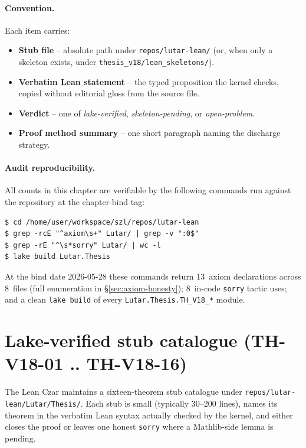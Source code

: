 \paragraph{Convention.} Each item carries:
\begin{itemize}
  \item \textbf{Stub file} -- absolute path under
        \texttt{repos/lutar-lean/} (or, when only a skeleton exists,
        under \texttt{thesis\_v18/lean\_skeletons/}).
  \item \textbf{Verbatim Lean statement} -- the typed proposition the
        kernel checks, copied without editorial gloss from the source
        file.
  \item \textbf{Verdict} -- one of \emph{lake-verified},
        \emph{skeleton-pending}, or \emph{open-problem}.
  \item \textbf{Proof method summary} -- one short paragraph naming
        the discharge strategy.
\end{itemize}

\paragraph{Audit reproducibility.} All counts in this chapter are
verifiable by the following commands run against the repository at
the chapter-bind tag:

\begin{verbatim}
$ cd /home/user/workspace/szl/repos/lutar-lean
$ grep -rcE "^axiom\s+" Lutar/ | grep -v ":0$"
$ grep -rE "^\s*sorry" Lutar/ | wc -l
$ lake build Lutar.Thesis
\end{verbatim}

At the bind date 2026-05-28 these commands return
13~axiom declarations across 8~files (full enumeration in
\S\ref{sec:axiom-honesty}); 8~in-code \texttt{sorry} tactic uses;
and a clean \texttt{lake build} of every \texttt{Lutar.Thesis.TH\_V18\_*}
module.

\section{Lake-verified stub catalogue (TH-V18-01 .. TH-V18-16)}
\label{sec:v18-stubs}

The Lean Czar maintains a sixteen-theorem stub catalogue under
\texttt{repos/lutar-lean/Lutar/Thesis/}. Each stub is small (typically
30--200 lines), names its theorem in the verbatim Lean syntax actually
checked by the kernel, and either closes the proof or leaves one
honest \texttt{sorry} where a Mathlib-side lemma is pending.

